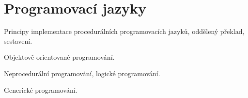 \section{Programovací jazyky}
\begin{pozadavky}
\begin{pitemize}
\item Principy implementace procedurálních programovacích jazyků, oddělený překlad, sestavení.
\item Objektově orientované programování.
\item Neprocedurální programování, logické programování.
\item Generické programování.
\end{pitemize}
\end{pozadavky}






